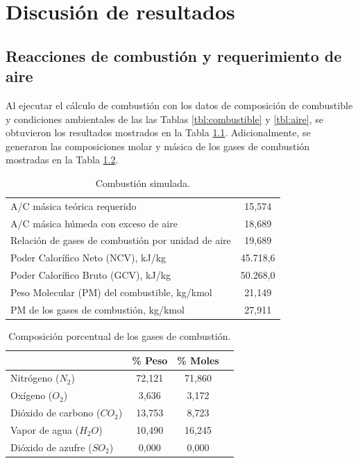 \chapter{Discusión de resultados}

\section{Reacciones de combustión y requerimiento de aire}
\par Al ejecutar el cálculo de combustión con los datos de composición de combustible y condiciones ambientales de las las Tablas \ref{tbl:combustible} y \ref{tbl:aire}, se obtuvieron los resultados mostrados en la Tabla \ref{tbl:combustion-data}. Adicionalmente, se generaron las composiciones molar y másica de los gases de combustión mostradas en la Tabla \ref{tbl:combustion-gas}.
\begin{table}[hbt] \begin{center}
\caption[Combustión simulada]{Combustión simulada.}
\label{tbl:combustion-data} \begin{tabular}{l|c}
	A/C másica teórica requerido					& 15,574 \\
	A/C másica húmeda con exceso de aire			& 18,689 \\
	Relación de gases de combustión por unidad de aire& 19,689 \\
	Poder Calorífico Neto  (NCV), kJ/kg				& 45.718,6 \\
	Poder Calorífico Bruto (GCV), kJ/kg				& 50.268,0 \\
	Peso Molecular (PM) del combustible, kg/kmol	& 21,149 \\
	PM de los gases de combustión, kg/kmol				& 27,911 \\
\end{tabular} \end{center} \end{table}
\begin{table}[htb] \begin{center}
\caption[Composición de los gases de combustión]
{Composición porcentual de los gases de combustión.}
\label{tbl:combustion-gas} \begin{tabular}{l|c|c|c}
	   & \% Peso & \% Moles \\
	\hline
	Nitrógeno ($N_2$)			& 72,121	& 71,860 \\
	Oxígeno ($O_2$)				& 3,636 	& 3,172	 \\
	Dióxido de carbono ($CO_2$)	& 13,753	& 8,723	 \\
	Vapor de agua ($H_2O$)		& 10,490	& 16,245 \\
	Dióxido de azufre ($SO_2$)	& 0,000 	& 0,000	 \\
\end{tabular} \end{center} \end{table}

